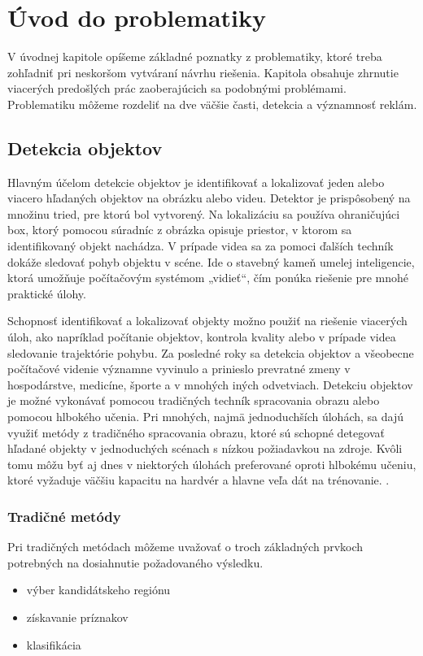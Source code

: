 \chapter{Úvod do problematiky}\label{chap:overview}

V úvodnej kapitole opíšeme základné poznatky z problematiky, ktoré treba zohľadniť pri neskoršom vytváraní návrhu riešenia. Kapitola obsahuje zhrnutie viacerých predošlých prác zaoberajúcich sa podobnými problémami. Problematiku môžeme rozdeliť na dve väčšie časti, detekcia a významnosť reklám.

\section{Detekcia objektov}

Hlavným účelom detekcie objektov je identifikovať a lokalizovať jeden alebo viacero hľadaných objektov na obrázku alebo videu. Detektor je prispôsobený na množinu tried, pre ktorú bol vytvorený. Na lokalizáciu sa používa ohraničujúci box, ktorý pomocou súradníc z obrázka opisuje priestor, v ktorom sa identifikovaný objekt nachádza. V prípade videa sa za pomoci ďalších techník dokáže sledovať pohyb objektu v scéne. Ide o stavebný kameň umelej inteligencie, ktorá umožňuje počítačovým systémom „vidieť“, čím ponúka riešenie pre mnohé praktické úlohy.

Schopnosť identifikovať a lokalizovať objekty možno použiť na riešenie viacerých úloh, ako napríklad počítanie objektov, kontrola kvality alebo v prípade videa sledovanie trajektórie pohybu. Za posledné roky sa detekcia objektov a všeobecne počítačové videnie významne vyvinulo a prinieslo prevratné zmeny v hospodárstve, medicíne, športe a v mnohých iných odvetviach. Detekciu objektov je možné vykonávať pomocou tradičných techník spracovania obrazu alebo pomocou hlbokého učenia. Pri mnohých, najmä jednoduchších úlohách, sa dajú využiť metódy z tradičného spracovania obrazu, ktoré sú schopné detegovať hľadané objekty v jednoduchých scénach s nízkou požiadavkou na zdroje. Kvôli tomu môžu byť aj dnes v niektorých úlohách preferované oproti hlbokému učeniu, ktoré vyžaduje väčšiu kapacitu na hardvér a hlavne veľa dát na trénovanie. \cite{CV-vs-DL}.

\subsection{Tradičné metódy}

Pri tradičných metódach môžeme uvažovať o troch základných prvkoch potrebných na dosiahnutie požadovaného výsledku.
\begin{itemize}
    \item výber kandidátskeho regiónu
    \item získavanie príznakov
    \item klasifikácia
\end{itemize}

